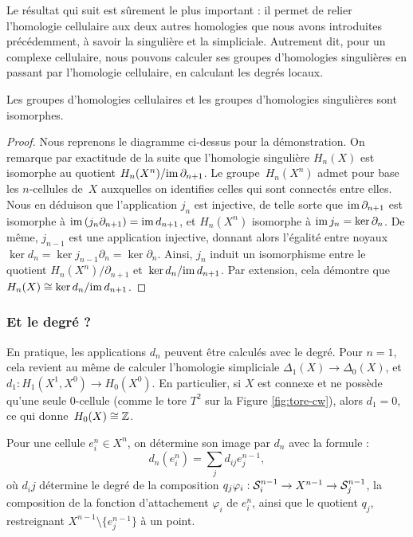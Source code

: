 Le résultat qui suit est sûrement le plus important : il permet de relier l'homologie cellulaire aux deux autres homologies que nous avons introduites précédemment, à savoir la singulière et la simpliciale. Autrement dit, pour un complexe cellulaire, nous pouvons calculer ses groupes d'homologies singulières en passant par l'homologie cellulaire, en calculant les degrés locaux.

\begin{theorem}
Les groupes d'homologies cellulaires et les groupes d'homologies singulières sont isomorphes.
\end{theorem}
\begin{proof}
Nous reprenons le diagramme ci-dessus pour la démonstration. On remarque par exactitude de la suite que l'homologie singulière $H_n(X)$ est isomorphe au quotient $H_n(X^n)/\mathrm{im}\,\partial_{n+1}$. Le groupe~$H_n(X^n)$ admet pour base les $n$-cellules de~$X$ auxquelles on identifies celles qui sont connectés entre elles. Nous en déduison que l'application $j_n$ est injective, de telle sorte que $\mathrm{im}\,\partial_{n+1}$ est isomorphe à ${\mathrm{im}\,(j_n\partial_{n+1})=\mathrm{im}\, d_{n+1}}$, et $H_n(X^n)$ isomorphe à $\mathrm{im}\, j_n=\ker\partial_n$. De même, $j_{n-1}$ est une application injective, donnant alors l'égalité entre noyaux $\ker d_n=\ker j_{n-1}\partial_n=\ker\partial_n$. Ainsi, $j_n$ induit un isomorphisme entre le quotient $H_n(X^n)/\partial_{n+1}$ et~$\ker d_n/\mathrm{im}\, d_{n+1}$. Par extension, cela démontre que $H_n(X)\cong \ker d_n/\mathrm{im}\, d_{n+1}$.
\end{proof}

\subsubsection{Et le degré ?}

En pratique, les applications $d_n$ peuvent être calculés avec le degré. Pour $n=1$, cela revient au même de calculer l'homologie simpliciale $\Delta_1(X)\to\Delta_0(X)$, et $d_1:H_1(X^1,X^0)\to H_0(X^0)$. En particulier, si $X$ est connexe et ne possède qu'une seule 0-cellule (comme le tore $T^2$ sur la Figure \ref{fig:tore-cw}), alors $d_1=0$, ce qui donne~$H_0(X)\cong\mathbb{Z}$.

\bigskip Pour une cellule $e_i^n\in X^n$, on détermine son image par $d_n$ avec la formule : \[d_n(e_i^n)=\sum_{j}d_{ij}e_j^{n-1},\]où ${d_ij}$ détermine le degré de la composition $q_j\varphi_i:\mathcal{S}^{n-1}_i\to X^{n-1}\to\mathcal{S}^{n-1}_j$, la composition de la fonction d'attachement $\varphi_i$ de $e^n_i$, ainsi que le quotient $q_j$, restreignant $X^{n-1}\setminus\{e^{n-1}_j\}$ à un point. 

